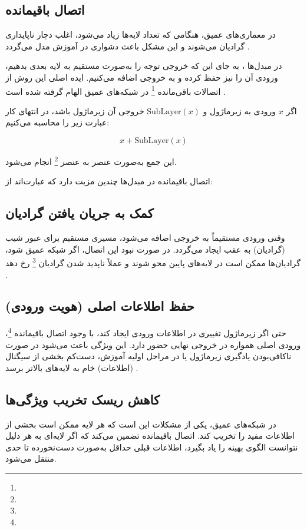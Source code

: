 \subsection{اتصال باقیمانده}
در معماری‌های عمیق، هنگامی که تعداد لایه‌ها زیاد می‌شود، اغلب دچار ناپایداری گرادیان می‌شوند و این مشکل باعث دشواری در آموزش مدل می‌گردد \cite{hochreiter1997long,bengio1994learning}.

در مبدل‌ها \cite{vaswani2017attention}، به جای این که خروجی توجه را به‌صورت مستقیم به لایه بعدی بدهیم، ورودی آن را نیز حفظ کرده و به خروجی اضافه می‌کنیم. ایده اصلی این روش از اتصالات باقی‌مانده \footnote{} در شبکه‌های عمیق الهام گرفته شده است \cite{he2016deep}.

اگر \( x \) ورودی به زیرماژول و \( \text{SubLayer}(x) \) خروجی آن زیرماژول باشد، در انتهای کار عبارت زیر را محاسبه می‌کنیم:

\begin{equation}
	x + \text{SubLayer}(x)
	\label{eq:sublayer}
\end{equation}

این جمع به‌صورت عنصر به عنصر \footnote{} انجام می‌شود.

اتصال باقیمانده در مبدل‌ها چندین مزیت دارد که عبارت‌اند از:

\subsection*{کمک به جریان یافتن گرادیان}
وقتی ورودی مستقیماً به خروجی اضافه می‌شود، مسیری مستقیم برای عبور شیب (گرادیان) به عقب ایجاد می‌گردد.
در صورت نبود این اتصال، اگر شبکه عمیق شود، گرادیان‌ها ممکن است در لایه‌های پایین محو شوند و عملاً ناپدید شدن گرادیان \footnote{} رخ دهد \cite{hochreiter1997long,bengio1994learning}.

\subsection*{حفظ اطلاعات اصلی (هویت ورودی)}
حتی اگر زیرماژول تغییری در اطلاعات ورودی ایجاد کند، با وجود اتصال باقیمانده \footnote{}، ورودی اصلی همواره در خروجی نهایی حضور دارد.
این ویژگی باعث می‌شود در صورت ناکافی‌بودن یادگیری زیرماژول یا در مراحل اولیه آموزش، دست‌کم بخشی از سیگنال (اطلاعات) خام به لایه‌های بالاتر برسد \cite{he2016deep,vaswani2017attention}.

\subsection*{کاهش ریسک تخریب ویژگی‌ها}
در شبکه‌های عمیق، یکی از مشکلات این است که هر لایه ممکن است بخشی از اطلاعات مفید را تخریب کند. اتصال باقیمانده تضمین می‌کند که اگر لایه‌ای به هر دلیل نتوانست الگوی بهینه را یاد بگیرد، اطلاعات قبلی حداقل به‌صورت دست‌نخورده تا حدی منتقل می‌شود.

